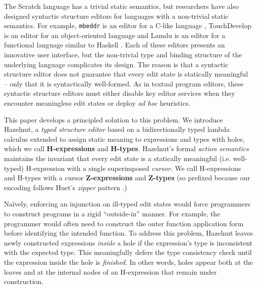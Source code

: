The Scratch language has a trivial static semantics, but researchers have also designed syntactic structure editors for  languages with a non-trivial static semantics. For example, \texttt{mbeddr} is an editor for a C-like language \cite{voelter_mbeddr:_2012}, TouchDevelop is an editor for an object-oriented language \cite{tillmann_touchdevelop:_2011} and Lamdu is an editor for a functional language similar to Haskell \cite{lamdu}. Each of these editors presents an innovative user interface, but the non-trivial type and binding structure of the underlying language complicates its design. The reason is that a syntactic structure editor does not guarantee that every edit state is statically meaningful -- only that it is syntactically well-formed. As in textual program editors, these syntactic structure editors must either disable key editor services when they encounter meaningless edit states or deploy \emph{ad hoc} heuristics.


This paper develops a principled solution to this problem. We introduce Hazelnut,  a \emph{typed structure editor}  based on a bidirectionally typed lambda calculus extended to assign static meaning to expressions and types with {holes}, which we call \textbf{H-expressions} and \textbf{H-types}. Hazelnut's formal \emph{action semantics} maintains the invariant that every edit state is a statically meaningful (i.e. well-typed) H-expression with a single superimposed \emph{cursor}. We call H-expressions and H-types with a cursor \textbf{Z-expressions} and \textbf{Z-types} (so prefixed because our encoding follows Huet's \emph{zipper} pattern \cite{JFP::Huet1997}.) %

Na\"ively, enforcing an injunction on ill-typed edit states would force programmers to construct programs in a rigid ``outside-in'' manner. For example, the programmer would often need to construct the outer function application form before identifying the intended function. To address this problem, Hazelnut leaves newly constructed expressions \emph{inside} a hole if the expression's type is inconsistent with the expected type. This meaningfully defers the type consistency check until the expression inside the hole is \emph{finished}. In other words, holes appear both at the leaves and at the internal nodes of an H-expression that remain under construction. %

